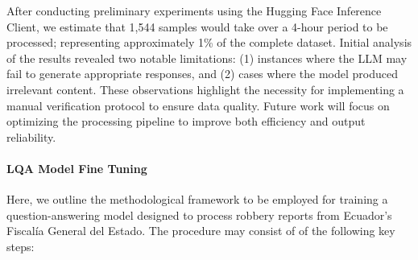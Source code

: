 \documentclass[onecolumn, journal, english, 12pt, a4paper]{IEEEtran} %
\theoremstyle{definition}
\begin{document}
After conducting preliminary experiments using the Hugging Face
Inference Client, we estimate that 1,544 samples would take over a
4-hour period to be processed; representing approximately 1\% of the
complete dataset. Initial analysis of the results revealed two notable
limitations: (1) instances where the LLM may fail to generate
appropriate responses, and (2) cases where the model produced
irrelevant content. These observations highlight the necessity for
implementing a manual verification protocol to ensure data
quality. Future work will focus on optimizing the processing
pipeline to improve both efficiency and output reliability.

\paragraph{LQA Model Fine Tuning}

Here, we outline the methodological framework to be employed for
training a question-answering model designed to process robbery
reports from Ecuador's Fiscalía General del Estado. The procedure may
consist of of the following key steps:
\end{document}
